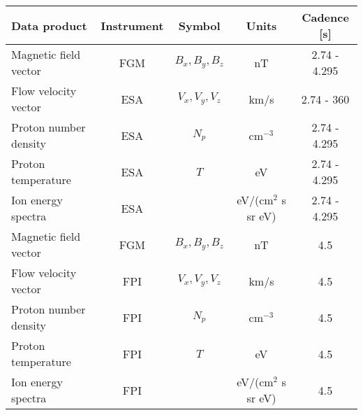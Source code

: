 \begin{tabular}{lcccc}
\hline
Data product          & Instrument & Symbol           & Units        & Cadence [s] \\
\hline
Magnetic field vector 	& FGM      & $B_x, B_y, B_z$  & nT                   & 2.74 - 4.295 \\
Flow velocity vector  		& ESA       & $V_x, V_y, V_z$  & km/s                & 2.74 - 360 \\
Proton number density	& ESA       & $N_p$            	& cm$^{-3}$       & 2.74 - 4.295 \\
Proton temperature    	& ESA       & $T$            		& eV                   & 2.74 - 4.295 \\
Ion energy spectra    	& ESA       &                  		& eV/(cm$^2$ s sr eV)  & 2.74 - 4.295 \\
\hline
Magnetic field vector 	& FGM      & $B_x, B_y, B_z$  & nT                     & 4.5 \\
Flow velocity vector  		& FPI        & $V_x, V_y, V_z$  & km/s                  & 4.5 \\
Proton number density 	& FPI        & $N_p$            	& cm$^{-3}$        & 4.5 \\
Proton temperature    	& FPI        & $T$            		& eV                    & 4.5 \\
Ion energy spectra   		& FPI        &                  		& eV/(cm$^2$ s sr eV)  & 4.5 \\
\hline
\end{tabular}